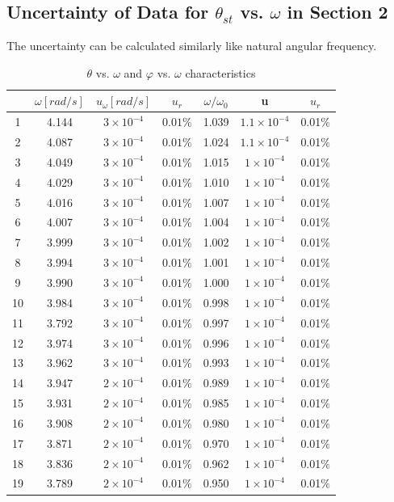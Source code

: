 \documentclass[12pt]{article}
\begin{document}
\subsection{Uncertainty of Data for $\theta_{st}$ vs. $\omega$ in Section 2}
The uncertainty can be calculated similarly like natural angular frequency.
\begin{table}[H]
\centering
\begin{tabular}{|c|c|c|c|c|c|c|}
\hline
   &$\omega[rad/s]$ &$u_{\omega}[rad/s]$&$u_r$&$\omega/\omega_0$&u&$u_r$ \\ \hline
1  & 4.144 & $3\times10^{-4}$ & $0.01\%$&1.039&$1.1\times10^{-4}$&0.01$\%$ \\ \hline
2  & 4.087 & $3\times10^{-4}$ & $0.01\%$&1.024&$1.1\times10^{-4}$&0.01$\%$ \\ \hline
3  & 4.049 & $3\times10^{-4}$ & $0.01\%$&1.015&$1\times10^{-4}$&0.01$\%$\\ \hline
4  & 4.029 & $3\times10^{-4}$ & $0.01\%$&1.010&$1\times10^{-4}$&0.01$\%$ \\ \hline
5  & 4.016 & $3\times10^{-4}$ & $0.01\%$&1.007&$1\times10^{-4}$&0.01$\%$ \\ \hline
6  & 4.007 & $3\times10^{-4}$ & $0.01\%$&1.004&$1\times10^{-4}$&0.01$\%$ \\ \hline
7  & 3.999 & $3\times10^{-4}$ & $0.01\%$&1.002&$1\times10^{-4}$&0.01$\%$ \\ \hline
8  & 3.994 & $3\times10^{-4}$ & $0.01\%$&1.001&$1\times10^{-4}$&0.01$\%$ \\ \hline
9  & 3.990 & $3\times10^{-4}$  & $0.01\%$&1.000&$1\times10^{-4}$&0.01$\%$ \\ \hline
10 & 3.984 & $3\times10^{-4}$  & $0.01\%$&0.998&$1\times10^{-4}$&0.01$\%$ \\ \hline
11 & 3.792 & $3\times10^{-4}$  & $0.01\%$&0.997&$1\times10^{-4}$&0.01$\%$ \\ \hline
12 & 3.974 & $3\times10^{-4}$  & $0.01\%$&0.996&$1\times10^{-4}$&0.01$\%$ \\ \hline
13 & 3.962 & $3\times10^{-4}$  & $0.01\%$&0.993&$1\times10^{-4}$&0.01$\%$ \\ \hline
14 & 3.947 & $2\times10^{-4}$  & $0.01\%$&0.989&$1\times10^{-4}$&0.01$\%$ \\ \hline
15 & 3.931 & $2\times10^{-4}$  & $0.01\%$&0.985&$1\times10^{-4}$&0.01$\%$ \\ \hline
16 & 3.908 & $2\times10^{-4}$  & $0.01\%$&0.980&$1\times10^{-4}$&0.01$\%$ \\ \hline
17 & 3.871 & $2\times10^{-4}$  & $0.01\%$&0.970&$1\times10^{-4}$&0.01$\%$  \\ \hline
18 & 3.836 & $2\times10^{-4}$  & $0.01\%$&0.962&$1\times10^{-4}$&0.01$\%$  \\ \hline
19 & 3.789 & $2\times10^{-4}$  & $0.01\%$&0.950&$1\times10^{-4}$&0.01$\%$  \\ \hline
\end{tabular}
\caption{$\theta$ vs. $\omega$ and $\varphi$ vs. $\omega$ characteristics}
\end{table}
\end{document}
